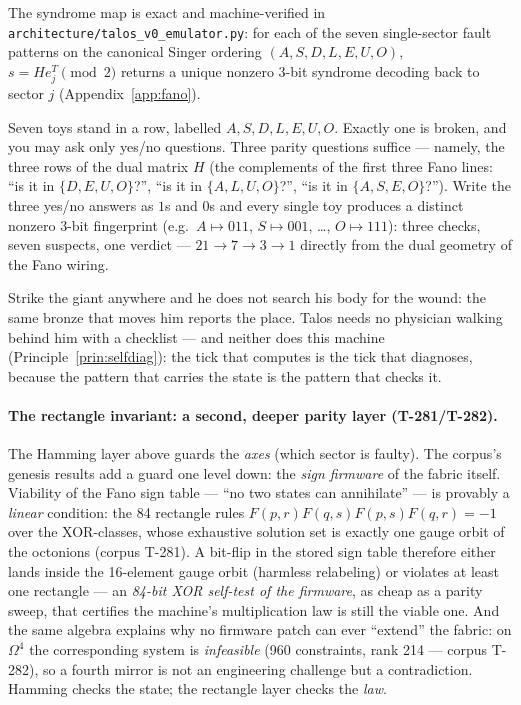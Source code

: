 The syndrome map is exact and machine-verified in
\texttt{architecture/talos\_v0\_emulator.py}: for each of the seven
single-sector fault patterns on the canonical Singer ordering
$(A,S,D,L,E,U,O)$, $s = He_j^T \pmod 2$ returns a unique nonzero $3$-bit
syndrome decoding back to sector $j$ (Appendix~\ref{app:fano}).

\begin{zerobox}
Seven toys stand in a row, labelled $A,S,D,L,E,U,O$. Exactly one is broken, and
you may ask only yes/no questions. Three parity questions suffice --- namely,
the three rows of the dual matrix $H$ (the complements of the first three Fano
lines: ``is it in $\{D,E,U,O\}$?'', ``is it in $\{A,L,U,O\}$?'', ``is it in
$\{A,S,E,O\}$?''). Write the three yes/no answers as $1$s and $0$s and every
single toy produces a distinct nonzero $3$-bit fingerprint (e.g.\ $A\mapsto 011$,
$S\mapsto 001$, \dots, $O\mapsto 111$): three checks, seven suspects, one
verdict --- $21\to 7\to 3\to 1$ directly from the dual geometry of the Fano
wiring.
\end{zerobox}

\begin{mythbox}
Strike the giant anywhere and he does not search his body for the wound: the
same bronze that moves him reports the place. Talos needs no physician
walking behind him with a checklist --- and neither does this machine
(Principle~\ref{prin:selfdiag}): the tick that computes is the tick that
diagnoses, because the pattern that carries the state is the pattern that
checks it.
\end{mythbox}

\paragraph{The rectangle invariant: a second, deeper parity layer (T-281/T-282).}
The Hamming layer above guards the \emph{axes} (which sector is faulty). The
corpus's genesis results add a guard one level down: the \emph{sign firmware}
of the fabric itself. Viability of the Fano sign table --- ``no two states can
annihilate'' --- is provably a \emph{linear} condition: the 84 rectangle rules
$F(p,r)F(q,s)F(p,s)F(q,r) = -1$ over the XOR-classes, whose exhaustive solution
set is exactly one gauge orbit of the octonions (corpus T-281). A bit-flip in
the stored sign table therefore either lands inside the 16-element gauge orbit
(harmless relabeling) or violates at least one rectangle --- an \emph{84-bit
XOR self-test of the firmware}, as cheap as a parity sweep, that certifies the
machine's multiplication law is still the viable one. And the same algebra
explains why no firmware patch can ever ``extend'' the fabric: on
$\Omega^4$ the corresponding system is \emph{infeasible} (960 constraints,
rank 214 --- corpus T-282), so a fourth mirror is not an engineering
challenge but a contradiction. Hamming checks the state; the rectangle layer
checks the \emph{law}.

